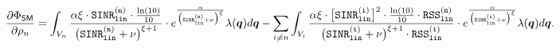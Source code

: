 \begin{figure*}[t!]
    \begin{multline}\label{gradient-SM-wrt-power-equation}
    \frac{\partial \Phi_{{\sf SM}}}{\partial \rho_n} =   \int_{V_n } \frac{\alpha\xi \cdot \mathtt{SINR_{\mathtt{lin}}^{(n)}} \cdot \frac{\ln(10)}{10} }{\big(\mathtt{SINR_{\mathtt{lin}}^{(n)}} + \nu\big)^{\xi + 1}} \cdot e^{\frac{\alpha}{\big(\mathtt{SINR^{(n)}_{\mathtt{lin}}} + \nu \big)^\xi}}   \lambda(\bm{q})d\bm{q}   
    - \sum_{i\neq n}   \int_{V_i } \frac{\alpha\xi\cdot \big[\mathtt{SINR_{\mathtt{lin}}^{(i)}} \big]^2 \cdot \frac{\ln(10)}{10}\cdot \mathtt{RSS_{\mathtt{lin}}^{(n)}}    }{\big(\mathtt{SINR_{\mathtt{lin}}^{(i)}} + \nu\big)^{\xi + 1}\cdot \mathtt{RSS_{\mathtt{lin}}^{(i)}}} \cdot e^{\frac{\alpha}{\big(\mathtt{SINR_{\mathtt{lin}}^{(i)}} + \nu \big)^\xi}}   \lambda(\bm{q})d\bm{q}.
\end{multline}
\end{figure*}

